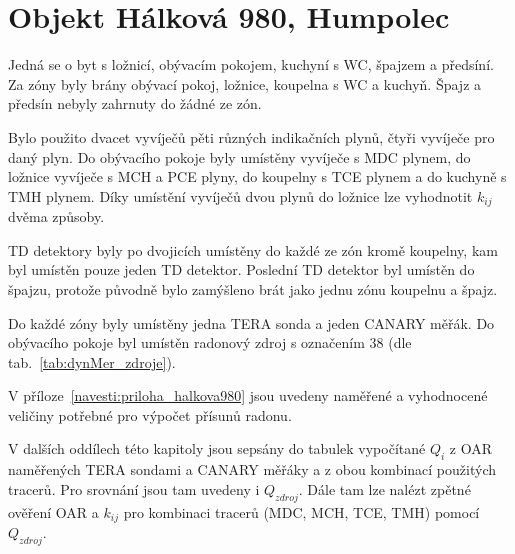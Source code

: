 \section{Objekt Hálková 980, Humpolec}
Jedná se o byt s ložnicí, obývacím pokojem, kuchyní s WC, špajzem a předsíní. Za zóny byly brány obývací pokoj, ložnice, koupelna s WC a kuchyň. Špajz a předsín nebyly zahrnuty do žádné ze zón.

Bylo použito dvacet vyvíječů pěti různých indikačních plynů, čtyři vyvíječe pro daný plyn. Do obývacího pokoje byly umístěny vyvíječe s MDC plynem, do ložnice vyvíječe s MCH a PCE plyny, do koupelny s TCE plynem a do kuchyně s TMH plynem. Díky umístění vyvíječů dvou plynů do ložnice lze vyhodnotit $k_{ij}$ dvěma způsoby.

TD detektory byly po dvojicích umístěny do každé ze zón kromě koupelny, kam byl umístěn pouze jeden TD detektor. Poslední TD detektor byl umístěn do špajzu, protože původně bylo zamýšleno brát jako jednu zónu koupelnu a špajz. %

Do každé zóny byly umístěny jedna TERA sonda a jeden CANARY měřák. Do obývacího pokoje byl umístěn radonový zdroj s označením 38 (dle tab.~\ref{tab:dynMer_zdroje}).

V příloze~\ref{navesti:priloha_halkova980} jsou uvedeny naměřené a vyhodnocené veličiny potřebné pro výpočet přísunů radonu.

V dalších oddílech této kapitoly jsou sepsány do tabulek vypočítané $Q_i$ z OAR naměřených TERA sondami a CANARY měřáky a z obou kombinací použitých tracerů. Pro srovnání jsou tam uvedeny i $Q_{zdroj}$. Dále tam lze nalézt zpětné ověření OAR a $k_{ij}$ pro kombinaci tracerů (MDC, MCH, TCE, TMH) pomocí $Q_{zdroj}$.


